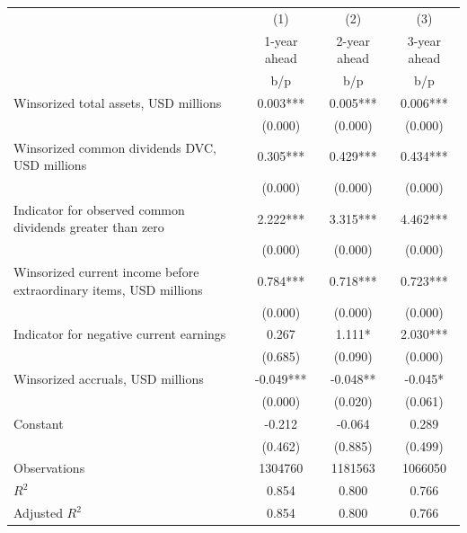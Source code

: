 {
\def\sym#1{\ifmmode^{#1}\else\(^{#1}\)\fi}
\begin{tabular}{l*{3}{c}}
\hline\hline
                    &\multicolumn{1}{c}{(1)}&\multicolumn{1}{c}{(2)}&\multicolumn{1}{c}{(3)}\\
                    &\multicolumn{1}{c}{1-year ahead}&\multicolumn{1}{c}{2-year ahead}&\multicolumn{1}{c}{3-year ahead}\\
                    &         b/p   &         b/p   &         b/p   \\
\hline
Winsorized total assets, USD millions&       0.003***&       0.005***&       0.006***\\
                    &     (0.000)   &     (0.000)   &     (0.000)   \\
Winsorized common dividends DVC, USD millions&       0.305***&       0.429***&       0.434***\\
                    &     (0.000)   &     (0.000)   &     (0.000)   \\
Indicator for observed common dividends greater than zero&       2.222***&       3.315***&       4.462***\\
                    &     (0.000)   &     (0.000)   &     (0.000)   \\
Winsorized current income before extraordinary items, USD millions&       0.784***&       0.718***&       0.723***\\
                    &     (0.000)   &     (0.000)   &     (0.000)   \\
Indicator for negative current earnings&       0.267   &       1.111*  &       2.030***\\
                    &     (0.685)   &     (0.090)   &     (0.000)   \\
Winsorized accruals, USD millions&      -0.049***&      -0.048** &      -0.045*  \\
                    &     (0.000)   &     (0.020)   &     (0.061)   \\
Constant            &      -0.212   &      -0.064   &       0.289   \\
                    &     (0.462)   &     (0.885)   &     (0.499)   \\
\hline
Observations        &     1304760   &     1181563   &     1066050   \\
\(R^{2}\)           &       0.854   &       0.800   &       0.766   \\
Adjusted \(R^{2}\)  &       0.854   &       0.800   &       0.766   \\
\hline\hline
\end{tabular}
}
